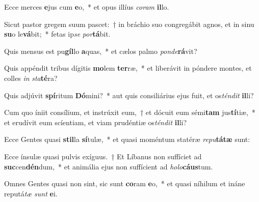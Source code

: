 \item Ecce merces \textbf{e}jus cum \textbf{e}o,~* et opus illíus \textit{co}\textit{ram} \textbf{il}lo.
\item Sicut pastor gregem suum pascet:~† in bráchio suo congregábit agnos, et in sinu \textbf{su}o le\textbf{vá}bit;~* fetas ip\textit{se} \textit{por}\textbf{tá}bit.
\item Quis mensus est pu\textbf{gíl}lo \textbf{a}quas,~* et cælos palmo \textit{pon}\textit{de}\textbf{rá}vit?
\item Quis appéndit tribus dígitis \textbf{mo}lem \textbf{ter}ræ,~* et liberávit in póndere montes, et colles \textit{in} \textit{sta}\textbf{té}ra?
\item Quis adjúvit \textbf{spí}ritum \textbf{Dó}mini?~* aut quis consiliárius ejus fuit, et os\textit{tén}\textit{dit} \textbf{il}li?
\item Cum quo íniit consílium, et instrúxit eum,~† et dócuit eum sémi\textbf{tam} jus\textbf{tí}tiæ,~* et erudívit eum scíentiam, et viam prudéntiæ os\textit{tén}\textit{dit} \textbf{il}li?
\item Ecce Gentes quasi \textbf{stil}la \textbf{sí}tulæ,~* et quasi moméntum statéræ \textit{re}\textit{pu}\textbf{tá}\textbf{tæ} sunt:
\item Ecce ínsulæ quasi pulvis exíguus.~† Et Líbanus non suffíciet ad \textbf{suc}cen\textbf{dén}dum,~* et animália ejus non suffícient ad \textit{ho}\textit{lo}\textbf{cáus}tum.
\item Omnes Gentes quasi non sint, sic sunt \textbf{co}ram \textbf{e}o,~* et quasi níhilum et ináne reputá\textit{tæ} \textit{sunt} \textbf{e}i.
